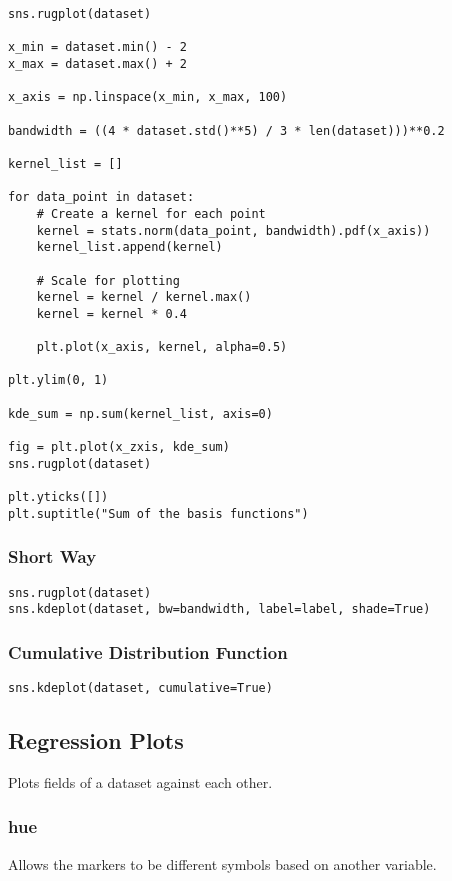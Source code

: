 \begin{lstlisting}
sns.rugplot(dataset)

x_min = dataset.min() - 2
x_max = dataset.max() + 2

x_axis = np.linspace(x_min, x_max, 100)

bandwidth = ((4 * dataset.std()**5) / 3 * len(dataset)))**0.2

kernel_list = []

for data_point in dataset:
    # Create a kernel for each point
    kernel = stats.norm(data_point, bandwidth).pdf(x_axis))
    kernel_list.append(kernel)

    # Scale for plotting
    kernel = kernel / kernel.max()
    kernel = kernel * 0.4

    plt.plot(x_axis, kernel, alpha=0.5)

plt.ylim(0, 1)

kde_sum = np.sum(kernel_list, axis=0)

fig = plt.plot(x_zxis, kde_sum)
sns.rugplot(dataset)

plt.yticks([])
plt.suptitle("Sum of the basis functions")
\end{lstlisting}

%
\subsubsection{Short Way}

\begin{lstlisting}
sns.rugplot(dataset)
sns.kdeplot(dataset, bw=bandwidth, label=label, shade=True)
\end{lstlisting}

%
\subsubsection{Cumulative Distribution Function}

\begin{lstlisting}
sns.kdeplot(dataset, cumulative=True)
\end{lstlisting}

\subsection{Regression Plots}
Plots fields of a dataset against each other.

%
\subsubsection{hue}
Allows the markers to be different symbols based on another variable.

